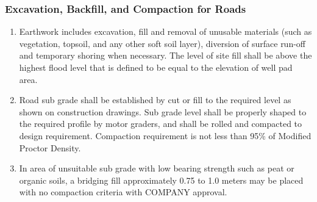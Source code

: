 \documentclass{article}%
\begin{document}
%
\subsubsection{Excavation, Backfill, and Compaction for Roads}%
\label{ssubsec:Excavation,Backfill,andCompactionforRoads}%
\begin{enumerate}[label=\alph*),start=1]%
\item%
Earthwork includes excavation, fill and removal of unusable materials (such as vegetation, topsoil, and any other soft soil layer), diversion of surface run{-}off and temporary shoring when necessary. The level of site fill shall be above the highest flood level that is defined to be equal to the elevation of well pad area.%
\item%
Road sub grade shall be established by cut or fill to the required level as shown on construction drawings.  Sub grade level  shall be properly shaped to the required profile by motor graders, and shall be rolled and compacted to design requirement. Compaction requirement is not less than 95\% of Modified Proctor Density.%
\item%
In area of unsuitable sub grade with low bearing strength such as peat or organic soils, a bridging fill approximately 0.75 to 1.0 meters may be placed with no compaction criteria with COMPANY approval.%
\end{enumerate}

%
\end{document}
